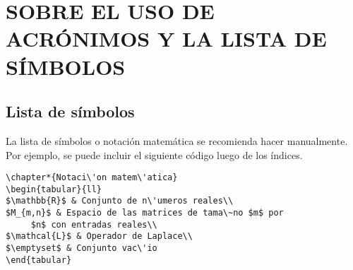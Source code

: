 \chapter{SOBRE EL USO DE ACR\'ONIMOS Y LA LISTA DE S\'IMBOLOS}

\section{Lista de s\'imbolos}
La lista de s\'imbolos o notaci\'on matem\'atica se recomienda hacer manualmente. Por ejemplo, se puede incluir el siguiente c\'odigo luego de los \'indices.
\begin{verbatim}
\chapter*{Notaci\'on matem\'atica}
\begin{tabular}{ll}
$\mathbb{R}$ & Conjunto de n\'umeros reales\\
$M_{m,n}$ & Espacio de las matrices de tama\~no $m$ por 
     $n$ con entradas reales\\
$\mathcal{L}$ & Operador de Laplace\\
$\emptyset$ & Conjunto vac\'io
\end{tabular}
\end{verbatim}